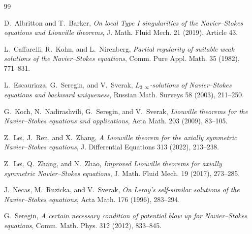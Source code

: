 \documentclass[11pt]{amsart}
\numberwithin{equation}{section}
\theoremstyle{plain}
\theoremstyle{definition}
\theoremstyle{remark}
\begin{document}
\begin{thebibliography}{99}

D.~Albritton and T.~Barker,
\emph{On local Type I singularities of the Navier--Stokes equations and
Liouville theorems},
J. Math. Fluid Mech. 21 (2019), Article 43.

L.~Caffarelli, R.~Kohn, and L.~Nirenberg,
\emph{Partial regularity of suitable weak solutions of the Navier--Stokes
equations},
Comm. Pure Appl. Math. 35 (1982), 771--831.

L.~Escauriaza, G.~Seregin, and V.~Sverak,
\emph{\(L_{3,\infty}\)-solutions of Navier--Stokes equations and backward
uniqueness},
Russian Math. Surveys 58 (2003), 211--250.

G.~Koch, N.~Nadirashvili, G.~Seregin, and V.~Sverak,
\emph{Liouville theorems for the Navier--Stokes equations and applications},
Acta Math. 203 (2009), 83--105.

Z.~Lei, J.~Ren, and X.~Zhang,
\emph{A Liouville theorem for the axially symmetric Navier--Stokes equations},
J. Differential Equations 313 (2022), 213--238.

Z.~Lei, Q.~Zhang, and N.~Zhao,
\emph{Improved Liouville theorems for axially symmetric Navier--Stokes
equations},
J. Math. Fluid Mech. 19 (2017), 273--285.

J.~Necas, M.~Ruzicka, and V.~Sverak,
\emph{On Leray's self-similar solutions of the Navier--Stokes equations},
Acta Math. 176 (1996), 283--294.

G.~Seregin,
\emph{A certain necessary condition of potential blow up for Navier--Stokes
equations},
Comm. Math. Phys. 312 (2012), 833--845.

\end{thebibliography}
\end{document}

